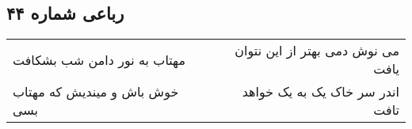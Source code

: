 \begin{center}
\section*{رباعی شماره ۴۴}
\label{sec:sh044}
\begin{longtable}{l p{0.5cm} r}
مهتاب به نور دامن شب بشکافت
&&
می نوش دمی بهتر از این نتوان یافت
\\
خوش باش و میندیش که مهتاب بسی
&&
اندر سر خاک یک به یک خواهد تافت
\\
\end{longtable}
\end{center}
